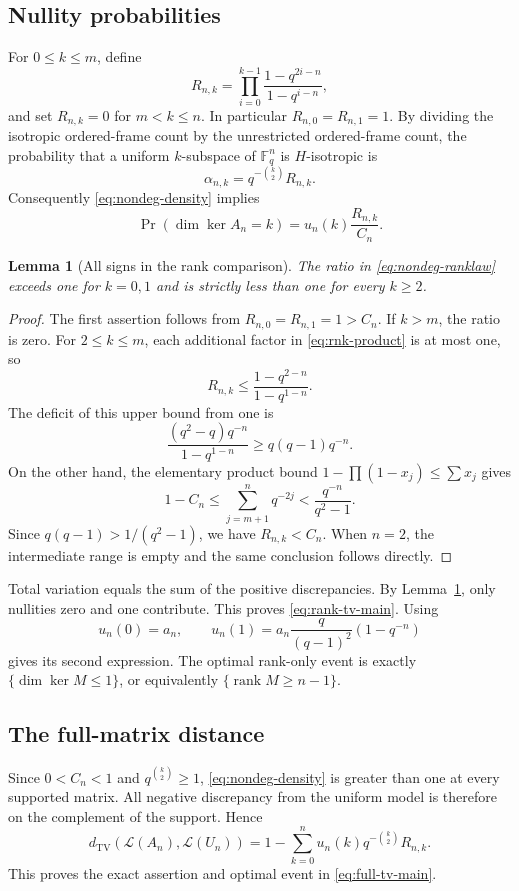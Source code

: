 \documentclass[11pt]{article}
\newcommand{\F}{\mathbb F_q}
\newcommand{\TV}{d_{\mathrm{TV}}}
\newcommand{\Law}{\mathcal L}
\newcommand{\rank}{\operatorname{rank}}
\newcommand{\1}{\mathbf 1}
\newtheorem{lemma}[theorem]{Lemma}
\theoremstyle{definition}
\theoremstyle{remark}
\numberwithin{equation}{section}
\begin{document}
\subsection{Nullity probabilities}
For $0\le k\le m$, define
\begin{equation}\label{eq:rnk-product}
R_{n,k}=\prod_{i=0}^{k-1}\frac{1-q^{2i-n}}{1-q^{i-n}},
\end{equation}
and set $R_{n,k}=0$ for $m<k\le n$. In particular $R_{n,0}=R_{n,1}=1$.
By dividing the isotropic ordered-frame count by the unrestricted ordered-frame count, the probability that a uniform $k$-subspace of $\F^n$ is $H$-isotropic is
\begin{equation}\label{eq:isoprob}
\alpha_{n,k}=q^{-\binom{k}{2}}R_{n,k}.
\end{equation}
Consequently \eqref{eq:nondeg-density} implies
\begin{equation}\label{eq:nondeg-ranklaw}
\Pr(\dim\ker A_n=k)=u_n(k)\frac{R_{n,k}}{C_n}.
\end{equation}

\begin{lemma}[All signs in the rank comparison]\label{lem:signs}
The ratio in \eqref{eq:nondeg-ranklaw} exceeds one for $k=0,1$ and is strictly less than one for every $k\ge2$.
\end{lemma}
\begin{proof}
The first assertion follows from $R_{n,0}=R_{n,1}=1>C_n$. If $k>m$, the ratio is zero. For $2\le k\le m$, each additional factor in \eqref{eq:rnk-product} is at most one, so
\[
R_{n,k}\le\frac{1-q^{2-n}}{1-q^{1-n}}.
\]
The deficit of this upper bound from one is
\[
\frac{(q^2-q)q^{-n}}{1-q^{1-n}}\ge q(q-1)q^{-n}.
\]
On the other hand, the elementary product bound $1-\prod(1-x_j)\le\sum x_j$ gives
\[
1-C_n\le\sum_{j=m+1}^n q^{-2j}<\frac{q^{-n}}{q^2-1}.
\]
Since $q(q-1)>1/(q^2-1)$, we have $R_{n,k}<C_n$. When $n=2$, the intermediate range is empty and the same conclusion follows directly.
\end{proof}

Total variation equals the sum of the positive discrepancies. By Lemma~\ref{lem:signs}, only nullities zero and one contribute. This proves \eqref{eq:rank-tv-main}. Using
\[
u_n(0)=a_n,\qquad
u_n(1)=a_n\frac{q}{(q-1)^2}(1-q^{-n})
\]
gives its second expression. The optimal rank-only event is exactly
$\{\dim\ker M\le1\}$, or equivalently $\{\rank M\ge n-1\}$.

\subsection{The full-matrix distance}
Since $0<C_n<1$ and $q^{\binom{k}{2}}\ge1$, \eqref{eq:nondeg-density} is greater than one at every supported matrix. All negative discrepancy from the uniform model is therefore on the complement of the support. Hence
\begin{equation}\label{eq:fullfinite}
\TV(\Law(A_n),\Law(U_n))
=1-\sum_{k=0}^n u_n(k)q^{-\binom{k}{2}}R_{n,k}.
\end{equation}
This proves the exact assertion and optimal event in \eqref{eq:full-tv-main}.
\end{document}
